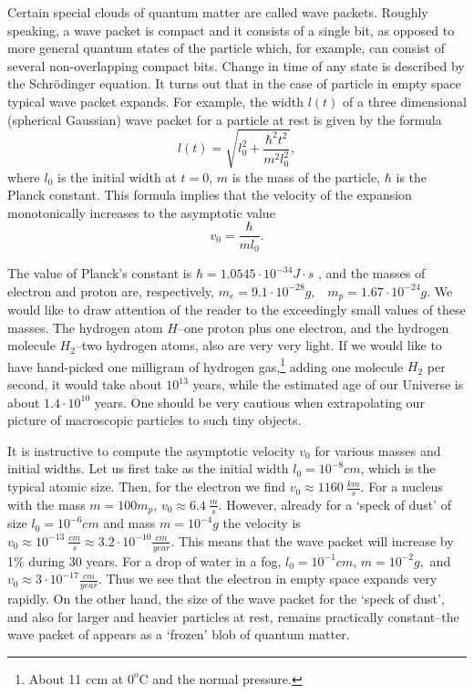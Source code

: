 \documentclass[12pt]{article}
\begin{document}
Certain special clouds of quantum matter are called wave packets. Roughly speaking, a wave packet is compact and it consists of a single bit, as opposed to more general quantum states of the particle which, for example, can consist of several non-overlapping compact bits. 
Change in time of any state is described by the Schr\"odinger equation.
It turns out that in the case of particle in empty space typical wave packet expands. For example, the width $l(t)$ of a
 three dimensional (spherical Gaussian) wave packet for a particle at rest is given by the formula \cite{qmtext}
\[ l(t) = \sqrt{l^2_0 + \frac{\hbar^2 t^2}{ m^2 l_0^2}}, \]
where $l_0$ is the initial width at $t=0$, $m$ is the mass of the particle, $\hbar$ is the Planck constant. This formula implies that the velocity of the expansion monotonically increases to the asymptotic value
\[ v_0 = \frac{\hbar}{ m l_0}.\]

 The value of Planck's constant is
$ \hbar = 1.0545 \cdot 10^{-34} J \cdot s$ , and the masses of electron and proton are, respectively, $m_e= 9.1 \cdot 10^{-28} g, \;\;\; m_p = 1.67 \cdot 10^{-24} g $. We would like to draw attention of the reader to the exceedingly small values of these masses. The hydrogen atom $H$--one proton plus one electron, and the hydrogen molecule $H_2$--two hydrogen atoms, also are very very light. If we would like to have hand-picked one milligram of hydrogen gas,\footnote{About 11 ccm at $0^{o}$C and the normal pressure.} adding one molecule $H_2$ per second, it would take about $10^{13}$ years, while the estimated age of our Universe is about $1.4 \cdot 10^{10}$ years. One should be very cautious when extrapolating our picture of macroscopic particles to such tiny objects.

It is instructive to compute the asymptotic velocity $v_0$ for various masses and initial widths. 
Let us first take as the initial width $l_0 = 10^{-8} cm $, which is the typical atomic size. Then, for the electron we find 
 $v_0 \approx 1160 \: \frac{km}{s}.$ For a nucleus with the mass $m= 100 m_p$, $v_0 \approx 6.4 \: \frac{m}{s}.$ However, already for a `speck of dust' of size $l_0=10^{-6} cm$ and mass 
 $m=10^{-4} g$ the velocity is $v_0 \approx 10^{-13} \: \frac{cm}{s} \approx 3.2 \cdot 10^{-10} \frac{cm}{year}.$ This means that the wave packet will increase by 1\% during 30 years. For a drop of water in a fog, $l_0 = 10^{-1} cm$, $m=10^{-2}g,$ and $v_0\approx 3\cdot 10^{-17} \frac{cm}{year}$. Thus we see that the electron in empty space expands very rapidly. On the other hand, the size of the wave packet for the `speck of dust', and also for larger and heavier particles at rest, remains practically constant--the wave packet of appears as a `frozen' blob of quantum matter. 
\end{document}
